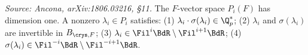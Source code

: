 \begin{proposition}
  \label{prop:periods-ram-dim}
  \textit{Source: Ancona, arXiv:1806.03216, \S11.}
  The \(F\)-vector space \(P_i(F)\) has dimension one. A nonzero
  \(\lambda_i \in P_i\) satisfies:
  (1) \(\lambda_i \cdot \sigma(\lambda_i) \in \Q_p^*\);
  (2) \(\lambda_i\) and \(\sigma(\lambda_i)\) are invertible in \(B_{\crys,F}\);
  (3) \(\lambda_i \in \Fil^i \BdR \setminus \Fil^{i+1} \BdR\);
  (4) \(\sigma(\lambda_i) \in \Fil^{-i} \BdR \setminus \Fil^{-i+1} \BdR\).
\end{proposition}

